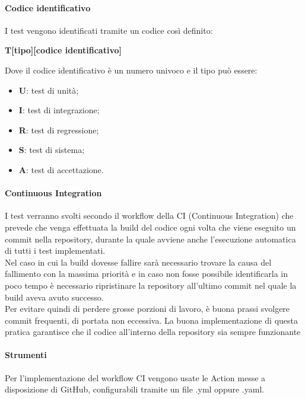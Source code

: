 \paragraph{Codice identificativo}
I test vengono identificati tramite un codice così definito:

\begin{center} \textbf{T[tipo][codice identificativo]} \end{center}

Dove il codice identificativo è un numero univoco e il tipo può essere:
\begin{itemize}
	\item \textbf{U}: test di unità;
	\item \textbf{I}: test di integrazione;
	\item \textbf{R}: test di regressione;
	\item \textbf{S}: test di sistema;
	\item \textbf{A}: test di accettazione.
\end{itemize}

\paragraph{Continuous Integration}
I test verranno svolti secondo il workflow della CI (Continuous Integration) che prevede che venga effettuata la build del codice ogni volta che viene eseguito un commit nella repository, durante la quale avviene anche l'esecuzione automatica di tutti i test implementati.\\
Nel caso in cui la build dovesse fallire sarà necessario trovare la causa del fallimento con la massima priorità e in caso non fosse possibile identificarla in poco tempo è necessario ripristinare la repository all'ultimo commit nel quale la build aveva avuto successo.\\
Per evitare quindi di perdere grosse porzioni di lavoro, è buona prassi svolgere commit frequenti, di portata non eccessiva.
La buona implementazione di questa pratica garantisce che il codice all'interno della repository sia sempre funzionante

\paragraph{Strumenti}
Per l'implementazione del workflow CI vengono usate le Action messe a disposizione di GitHub, configurabili tramite un file .yml oppure .yaml.